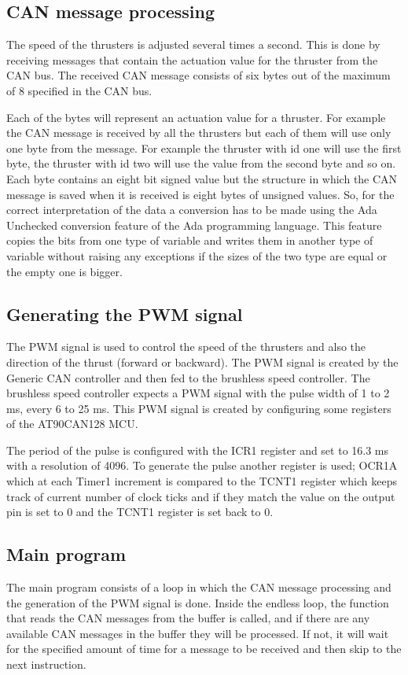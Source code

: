 \subsection{CAN message processing}
The speed of the thrusters is adjusted several times a second. This is done by receiving messages that contain the actuation value for the thruster from the CAN bus. The received CAN message consists of six bytes out of the maximum of 8 specified in the CAN bus. 

Each of the bytes will represent an actuation value for a thruster. For example the CAN message is received by all the thrusters but each of them will use only one byte from the message. For example the thruster with id one will use the first byte, the thruster with id two will use the value from the second byte and so on. Each byte contains an eight bit signed value but the structure in which the CAN message is saved when it is received is eight bytes of unsigned values. So, for the correct interpretation of the data a conversion has to be made using the Ada Unchecked conversion feature of the Ada programming language. This feature copies the bits from one type of variable and writes them in another type of variable without raising any exceptions if the sizes of the two type are equal or the empty one is bigger.  
\subsection{Generating the PWM signal}
The PWM signal is used to control the speed of the thrusters and also the direction of the thrust (forward or backward). The PWM signal is created by the Generic CAN controller and then fed to the brushless speed controller. The brushless speed controller expects a PWM signal with the pulse width of 1 to 2 ms, every 6 to 25 ms. This PWM signal is created by configuring some registers of the AT90CAN128 MCU.

 The period of the pulse is configured with the ICR1 register and set to 16.3 ms with a resolution of 4096. To generate the pulse another register is used; OCR1A which at each Timer1 increment is compared to the TCNT1 register which keeps track of current number of clock ticks and if they match the value on the output pin is set to 0 and the TCNT1 register is set back to 0. 

\subsection{Main program}
The main program consists of a loop in which the CAN message processing and the generation of the PWM signal is done. Inside the endless loop, the function that reads the CAN messages from the buffer is called, and if there are any available CAN messages in the buffer they will be processed. If not, it will wait for the specified amount of time for a message to be received and then skip to the next instruction.

 
